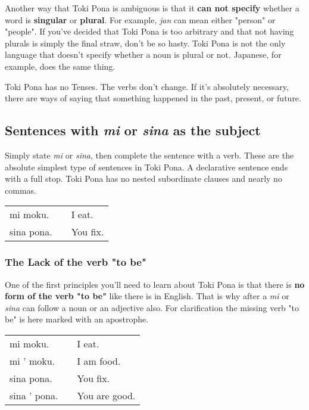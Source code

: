 Another way that Toki Pona is ambiguous is that it \textbf{can not specify} whether a word is \textbf{singular} or \textbf{plural}. 
For example, \textit{jan} can mean either "person" or "people". 
If you've decided that Toki Pona is too arbitrary and that not having plurals is simply the final straw, don't be so hasty. 
Toki Pona is not the only language that doesn't specify whether a noun is plural or not. 
Japanese, for example, does the same thing. 

Toki Pona has no Tenses. 
The verbs don't change. 
If it's absolutely necessary, there are ways of saying that something happened in the past, present, or future. 
% 
\subsection*{Sentences with \textit{mi} or \textit{sina }as the subject}
%
Simply state \textit{mi} or \textit{sina}, then complete the sentence with a verb. 
These are the absolute simplest type of sentences in Toki Pona. 
A declarative sentence ends with a full stop. 
Toki Pona has no nested subordinate clauses and nearly no commas. 

\begin{supertabular}{p{5,5cm}|ll}
mi moku. && I eat. \\
sina pona. && You fix. \\
\end{supertabular} 

\newpage
\subsubsection*{The Lack of the verb "to be"}
%
One of the first principles you'll need to learn about Toki Pona is that there is \textbf{no form of the verb "to be"} like there is in English. 
That is why after a \textit{mi} or \textit{sina} can follow a noun or an adjective also. 
For clarification the missing verb "to be" is here marked with an apostrophe. 

\begin{supertabular}{p{5cm}|ll}
mi moku. && I eat.  \\
mi ' moku. && I am food. \\  %
sina pona. && You fix. \\
sina ' pona. && You are good. \\  %
\end{supertabular} 


